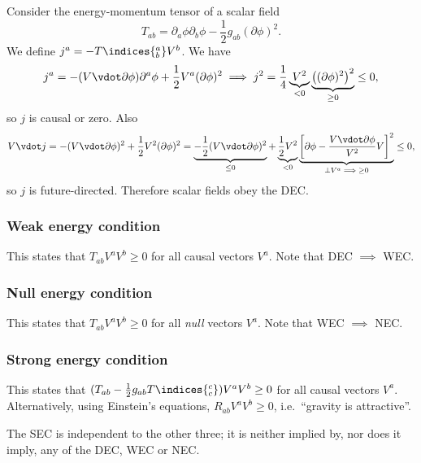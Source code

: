\documentclass{jknotes}
\begin{document}
\begin{eg}
    Consider the energy-momentum tensor of a scalar field
    \begin{equation}
        T_{ab} = \partial_a\phi\partial_b\phi - \frac{1}{2}g_{ab}(\partial\phi)^2.
    \end{equation}
    We define \(j^a = -T\indices{^a_b}V^b\). We have
    \begin{equation}
        j^a = -(V\vdot\partial\phi)\partial^a\phi + \frac{1}{2}V^a(\partial\phi)^2 
        \implies
        j^2 = \frac{1}{4}\underbrace{V^2}_{<0}\underbrace{\left((\partial\phi)^2\right)^2}_{\ge 0} 
        \le 0,
    \end{equation}
    so \(j\) is causal or zero. Also
    \begin{equation}
        V\vdot j = -(V\vdot\partial\phi)^2 + \frac{1}{2}V^2(\partial\phi)^2 = \underbrace{-\frac{1}{2}(V\vdot\partial\phi)^2}_{\le 0} + \underbrace{\frac{1}{2}V^2}_{<0} \underbrace{\left[\partial\phi - \frac{V\vdot\partial\phi}{V^2}V\right]^2}_{\perp V^a \implies \ge 0} \le 0,
    \end{equation}
    so \(j\) is future-directed. Therefore scalar fields obey the DEC.
\end{eg}

\subsubsection*{Weak energy condition}
This states that \(T_{ab}V^aV^b\ge 0\) for all causal vectors \(V^a\). Note that DEC \(\implies\) WEC.

\subsubsection*{Null energy condition}
This states that \(T_{ab}V^aV^b\ge 0\) for all \emph{null} vectors \(V^a\). Note that WEC \(\implies\) NEC.

\subsubsection*{Strong energy condition}
This states that \((T_{ab}-\frac{1}{2}g_{ab}T\indices{^c_c})V^aV^b \ge 0\) for all causal vectors \(V^a\). Alternatively, using Einstein's equations, \(R_{ab}V^aV^b\ge0\), i.e.\ ``gravity is attractive''.

The SEC is independent to the other three; it is neither implied by, nor does it imply, any of the DEC, WEC or NEC.
\end{document}
